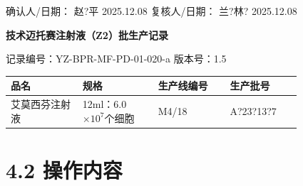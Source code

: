 \documentclass[UTF8,10pt,a4paper,fontset=fandol]{ctexart}
\newcommand{\fieldvalue}[1]{#1}
\newcommand{\handwritten}[1]{#1}
\begin{document}
确认人/日期：
\fieldvalue{\handwritten{赵?平 2025.12.08}}
\hfill
复核人/日期：
\fieldvalue{\handwritten{兰?林? 2025.12.08}}


\newpage

\begin{center}
\textbf{技术迈托赛注射液（Z2）批生产记录}
\end{center}

记录编号：YZ-BPR-MF-PD-01-020-a \qquad 版本号：1.5

\begin{tabular}{|p{0.20\linewidth}|p{0.21\linewidth}|p{0.20\linewidth}|p{0.20\linewidth}|}
\hline
品名 & 规格 & 生产线编号 & 生产批号 \\
\hline
艾莫西芬注射液 &
12ml：6.0$\times 10^7$个细胞 &
\fieldvalue{\handwritten{M4/18}} &
\fieldvalue{\handwritten{A?23?13?7}} \\
\hline
\end{tabular}

\section*{4.2 操作内容}
\end{document}
